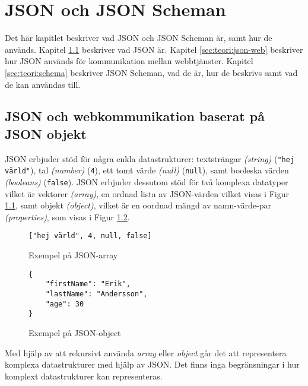 \chapter{JSON och JSON Scheman}
\label{sec:teori}
Det här kapitlet beskriver vad JSON och JSON Scheman är, samt hur de används. Kapitel \ref{sec:teori:json} beskriver vad JSON är. Kapitel \ref{sec:teori:json-web} beskriver hur JSON används för kommunikation mellan webbtjänster. Kapitel \ref{sec:teori:schema} beskriver JSON Scheman, vad de är, hur de beskrivs samt vad de kan användas till.

\section{JSON och webkommunikation baserat på JSON objekt}
\label{sec:teori:json}
JSON erbjuder stöd för några enkla datastrukturer: textsträngar \textit{(string)} (\texttt{"hej värld"}), tal \textit{(number)} (\texttt{4}), ett tomt värde \textit{(null)} (\texttt{null}), samt booleska värden \textit{(booleans)} (\texttt{false}). JSON erbjuder dessutom stöd för två komplexa datatyper vilket är vektorer \textit{(array)}, en ordnad lista av JSON-värden vilket visas i Figur \ref{fig:json-array-example}, samt objekt \textit{(object)}, vilket är en oordnad mängd av namn-värde-par \textit{(properties)}, som visas i Figur \ref{fig:json-object-example}.

\begin{figure}
	\begin{verbatim}
["hej värld", 4, null, false]
	\end{verbatim}
	\vspace{-1.7em}
	\caption{Exempel på JSON-array}
	\label{fig:json-array-example}
\end{figure}

\begin{figure}
	\begin{verbatim}
{
	"firstName": "Erik",
	"lastName": "Andersson",
	"age": 30
}
	\end{verbatim}
	\vspace{-1.7em}
	\caption{Exempel på JSON-object}
	\label{fig:json-object-example}
\end{figure}

\noindent
Med hjälp av att rekursivt använda \textit{array} eller \textit{object} går det att representera komplexa datastrukturer med hjälp av JSON. Det finns inga begränsningar i hur komplext datastrukturer kan representeras.

